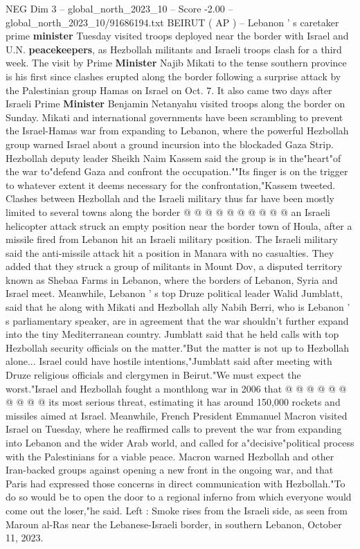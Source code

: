 \begin{textsample}{NEG Dim 3 – global\_north\_2023\_10 – Score -2.00 – global\_north\_2023\_10/91686194.txt}  \label{ex:f3_neg_251}
BEIRUT ( AP ) -- Lebanon ' s caretaker prime \textbf{minister} Tuesday visited troops deployed near the border with Israel and U.N. \textbf{peacekeepers}, as Hezbollah militants and Israeli troops clash for a third week.
The visit by Prime \textbf{Minister} Najib Mikati to the tense southern province is his first since clashes erupted along the border following a surprise attack by the Palestinian group Hamas on Israel on Oct. 7.
It also came two days after Israeli Prime \textbf{Minister} Benjamin Netanyahu visited troops along the border on Sunday.
Mikati and international governments have been scrambling to prevent the Israel-Hamas war from expanding to Lebanon, where the powerful Hezbollah group warned Israel about a ground incursion into the blockaded Gaza Strip.
Hezbollah deputy leader Sheikh Naim Kassem said the group is in the"heart"of the war to"defend Gaza and confront the occupation.""Its finger is on the trigger to whatever extent it deems necessary for the confrontation,"Kassem tweeted.
Clashes between Hezbollah and the Israeli military thus far have been mostly limited to several towns along the border @ @ @ @ @ @ @ @ @ @ an Israeli helicopter attack struck an empty position near the border town of Houla, after a missile fired from Lebanon hit an Israeli military position.
The Israeli military said the anti-missile attack hit a position in Manara with no casualties.
They added that they struck a group of militants in Mount Dov, a disputed territory known as Shebaa Farms in Lebanon, where the borders of Lebanon, Syria and Israel meet.
Meanwhile, Lebanon ' s top Druze political leader Walid Jumblatt, said that he along with Mikati and Hezbollah ally Nabih Berri, who is Lebanon ' s parliamentary speaker, are in agreement that the war shouldn't further expand into the tiny Mediterranean country.
Jumblatt said that he held calls with top Hezbollah security officials on the matter."But the matter is not up to Hezbollah alone...
Israel could have hostile intentions,"Jumblatt said after meeting with Druze religious officials and clergymen in Beirut."We must expect the worst."Israel and Hezbollah fought a monthlong war in 2006 that @ @ @ @ @ @ @ @ @ @ its most serious threat, estimating it has around 150,000 rockets and missiles aimed at Israel.
Meanwhile, French President Emmanuel Macron visited Israel on Tuesday, where he reaffirmed calls to prevent the war from expanding into Lebanon and the wider Arab world, and called for a"decisive"political process with the Palestinians for a viable peace.
Macron warned Hezbollah and other Iran-backed groups against opening a new front in the ongoing war, and that Paris had expressed those concerns in direct communication with Hezbollah."To do so would be to open the door to a regional inferno from which everyone would come out the loser,"he said.
Left : Smoke rises from the Israeli side, as seen from Maroun al-Ras near the Lebanese-Israeli border, in southern Lebanon, October 11, 2023.

\end{textsample}
